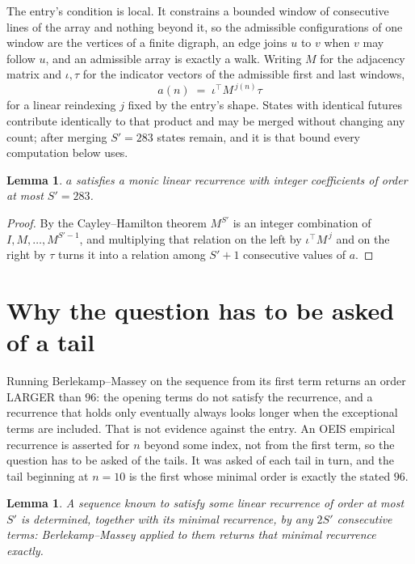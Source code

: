 \documentclass[11pt,a4paper]{article}
\theoremstyle{plain}
\newtheorem{lemma}[theorem]{Lemma}
\theoremstyle{definition}
\begin{document}
The entry's condition is local. It constrains a bounded window of consecutive lines of the
array and nothing beyond it, so the admissible configurations of one window are the vertices of
a finite digraph, an edge joins $u$ to $v$ when $v$ may follow $u$, and an admissible array is
exactly a walk. Writing $M$ for the adjacency matrix and $\iota,\tau$ for the indicator vectors
of the admissible first and last windows,
\[
a(n)\;=\;\iota^{\!\top}M^{\,j(n)}\tau
\]
for a linear reindexing $j$ fixed by the entry's shape. States with identical futures
contribute identically to that product and may be merged without changing any count; after
merging $S'=283$ states remain, and it is that bound every computation below uses.

\begin{lemma}\label{lem:cf}
$a$ satisfies a monic linear recurrence with integer coefficients of order at most $S'=283$.
\end{lemma}

\begin{proof}
By the Cayley--Hamilton theorem $M^{S'}$ is an integer combination of $I,M,\dots,M^{S'-1}$,
and multiplying that relation on the left by $\iota^{\!\top}M^{\,j}$ and on the right by
$\tau$ turns it into a relation among $S'+1$ consecutive values of $a$.
\end{proof}

\section{Why the question has to be asked of a tail}

Running Berlekamp--Massey on the sequence from its first term returns an order LARGER than $96$: the opening terms do not satisfy the recurrence, and a recurrence that holds only eventually always looks longer when the exceptional terms are included. That is not evidence against the entry. An OEIS empirical recurrence is asserted for $n$ beyond some index, not from the first term, so the question has to be asked of the tails. It was asked of each tail in turn, and the tail beginning at $n=10$ is the first whose minimal order is exactly the stated $96$.

\begin{lemma}\label{lem:bm}
A sequence known to satisfy some linear recurrence of order at most $S'$ is determined,
together with its minimal recurrence, by any $2S'$ consecutive terms: Berlekamp--Massey applied
to them returns that minimal recurrence exactly.
\end{lemma}
\end{document}
